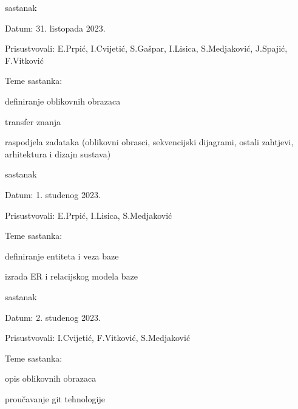 \begin{packed_enum}
			\item  sastanak
			\item[] \begin{packed_item}
				\item Datum: 31. listopada 2023.
				\item Prisustvovali: E.Prpić, I.Cvijetić, S.Gašpar, I.Lisica, S.Medjaković, J.Spajić, F.Vitković
				\item Teme sastanka:
				\begin{packed_item}
					\item  definiranje oblikovnih obrazaca
					\item  transfer znanja
					\item  raspodjela zadataka (oblikovni obrasci, sekvencijski dijagrami, ostali zahtjevi, arhitektura i dizajn sustava)
				\end{packed_item}
			\end{packed_item}
			
			\item  sastanak
			\item[] \begin{packed_item}
				\item Datum: 1. studenog 2023.
				\item Prisustvovali: E.Prpić, I.Lisica, S.Medjaković
				\item Teme sastanka:
				\begin{packed_item}
					\item  definiranje entiteta i veza baze
					\item  izrada ER i relacijskog modela baze
				\end{packed_item}
			\end{packed_item}
			
			\item  sastanak
			\item[] \begin{packed_item}
				\item Datum: 2. studenog 2023.
				\item Prisustvovali: I.Cvijetić, F.Vitković, S.Medjaković
				\item Teme sastanka:
				\begin{packed_item}
					\item  opis oblikovnih obrazaca
					\item  proučavanje git tehnologije
				\end{packed_item}
			\end{packed_item}
			

\end{packed_enum}
